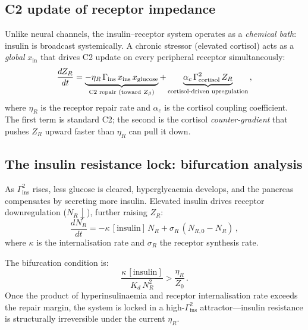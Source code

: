 \documentclass[aps,pre,twocolumn,superscriptaddress,floatfix]{revtex4-2}
\begin{document}
\subsection{C2 update of receptor impedance}
\label{sec:receptor-update}

Unlike neural channels, the insulin--receptor
system operates as a \emph{chemical bath}:
insulin is broadcast systemically.
A chronic stressor (elevated cortisol) acts as a
\emph{global} $x_{\text{in}}$ that drives
C2 update on every peripheral receptor
simultaneously:
\begin{equation}
  \frac{dZ_R}{dt}
  = \underbrace{-\eta_R\,\Gamma_{\text{ins}}
    \,x_{\text{ins}}\,x_{\text{glucose}}}_{%
      \text{C2 repair (toward } Z_\beta\text{)}}
  + \underbrace{\alpha_c\,
    \Gamma_{\text{cortisol}}^2
    \,Z_R}_{\text{cortisol-driven
    upregulation}}\,,
  \label{eq:dZR-dt}
\end{equation}
where $\eta_R$ is the receptor repair rate and
$\alpha_c$ is the cortisol coupling coefficient.
The first term is standard C2; the second is the
cortisol \emph{counter-gradient} that pushes $Z_R$
upward faster than $\eta_R$ can pull it down.


\subsection{The insulin resistance lock:
  bifurcation analysis}
\label{sec:ir-lock}

As $\Gamma_{\text{ins}}^2$ rises, less glucose is
cleared, hyperglycaemia develops, and the pancreas
compensates by secreting more insulin.
Elevated insulin drives receptor downregulation
($N_R \downarrow$), further raising $Z_R$:
\begin{equation}
  \frac{dN_R}{dt}
  = -\kappa\,[\text{insulin}]\,N_R
    + \sigma_R\,(N_{R,0} - N_R)\,,
  \label{eq:receptor-downreg}
\end{equation}
where $\kappa$ is the internalisation rate and
$\sigma_R$ the receptor synthesis rate.

The bifurcation condition is:
\begin{equation}
  \frac{\kappa\,[\text{insulin}]}
       {K_d\,N_R^2}
  > \frac{\eta_R}{Z_0}\,.
  \label{eq:ir-bifurcation}
\end{equation}
Once the product of hyperinsulinaemia and receptor
internalisation rate exceeds the repair margin,
the system is locked in a high-$\Gamma_{\text{ins}}^2$
attractor---insulin resistance is structurally
irreversible under the current $\eta_R$.
\end{document}
